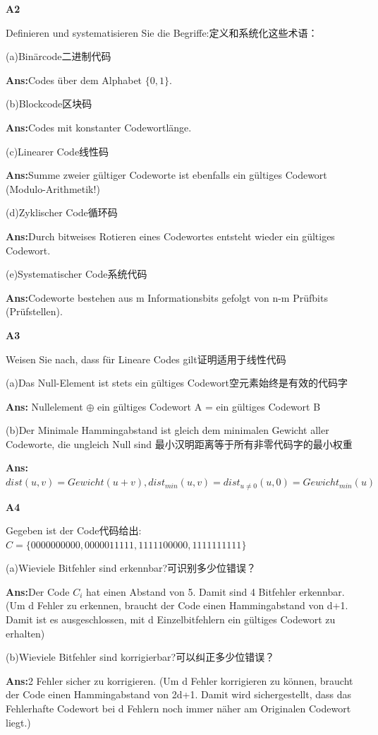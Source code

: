\documentclass[fleqn]{article}
\begin{document}
\noindent\textbf{A2}

Definieren und systematisieren Sie die Begriffe:定义和系统化这些术语：

(a)Binärcode二进制代码

\textbf{Ans:}Codes über dem Alphabet $\{0, 1\}$.

(b)Blockcode区块码

\textbf{Ans:}Codes mit konstanter Codewortlänge.

(c)Linearer Code线性码

\textbf{Ans:}Summe zweier gültiger Codeworte ist ebenfalls ein gültiges Codewort (Modulo-Arithmetik!)

(d)Zyklischer Code循环码

\textbf{Ans:}Durch bitweises Rotieren eines Codewortes entsteht wieder ein gültiges Codewort.

(e)Systematischer Code系统代码

\textbf{Ans:}Codeworte bestehen aus m Informationsbits gefolgt von n-m Prüfbits (Prüfstellen).

\noindent\textbf{A3}

Weisen Sie nach, dass für Lineare Codes gilt证明适用于线性代码

(a)Das Null-Element ist stets ein gültiges Codewort空元素始终是有效的代码字

\textbf{Ans:} Nullelement $\oplus$ ein gültiges Codewort A = ein gültiges Codewort B

(b)Der Minimale Hammingabstand ist gleich dem minimalen Gewicht aller Codeworte, die ungleich Null sind
最小汉明距离等于所有非零代码字的最小权重

\textbf{Ans:}$dist(u,v)=Gewicht(u+v),dist_{min}(u,v)=dist_{u\neq 0}(u,0)=Gewicht_{min}(u)$ 

\noindent\textbf{A4}

Gegeben ist der Code代码给出: $C=\{0000000000, 0000011111, 1111100000, 1111111111\}$

(a)Wieviele Bitfehler sind erkennbar?可识别多少位错误？

\textbf{Ans:}Der Code $C_i$ hat einen Abstand von 5. Damit sind 4 Bitfehler erkennbar.
(Um d Fehler zu erkennen, braucht der Code einen Hammingabstand von d+1. Damit ist es ausgeschlossen, mit d Einzelbitfehlern ein gültiges Codewort zu erhalten)

(b)Wieviele Bitfehler sind korrigierbar?可以纠正多少位错误？

\textbf{Ans:}2 Fehler sicher zu korrigieren.
(Um d Fehler korrigieren zu können, braucht der Code einen Hammingabstand von 2d+1. Damit wird sichergestellt, dass das Fehlerhafte Codewort bei d Fehlern noch immer näher am Originalen Codewort liegt.)
\end{document}
